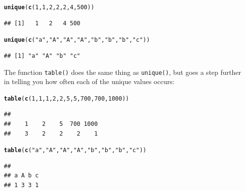 \documentclass{tufte-book}\usepackage[]{graphicx}\usepackage[]{color}
\makeatletter
\newcommand{\hlnum}[1]{\textcolor[rgb]{0.686,0.059,0.569}{#1}}%
\newcommand{\hlstr}[1]{\textcolor[rgb]{0.192,0.494,0.8}{#1}}%
\newcommand{\hlstd}[1]{\textcolor[rgb]{0.345,0.345,0.345}{#1}}%
\newcommand{\hlkwd}[1]{\textcolor[rgb]{0.737,0.353,0.396}{\textbf{#1}}}%
\newenvironment{kframe}{%
 \def\at@end@of@kframe{}%
 \ifinner\ifhmode%
  \def\at@end@of@kframe{\end{minipage}}%
  \begin{minipage}{\columnwidth}%
 \fi\fi%
 \def\FrameCommand##1{\hskip\@totalleftmargin \hskip-\fboxsep
 \colorbox{shadecolor}{##1}\hskip-\fboxsep
     \hskip-\linewidth \hskip-\@totalleftmargin \hskip\columnwidth}%
 \MakeFramed {\advance\hsize-\width
   \@totalleftmargin\z@ \linewidth\hsize
   \@setminipage}}%
 {\par\unskip\endMakeFramed%
 \at@end@of@kframe}
\newenvironment{knitrout}{}{} %
\makeatother
\begin{document}
\begin{footnotesize}
\begin{footnotesize}
\begin{knitrout}
\color{fgcolor}\begin{kframe}
\begin{alltt}
\hlkwd{unique}\hlstd{(}\hlkwd{c}\hlstd{(}\hlnum{1}\hlstd{,} \hlnum{1}\hlstd{,} \hlnum{2}\hlstd{,} \hlnum{2}\hlstd{,} \hlnum{2}\hlstd{,} \hlnum{4}\hlstd{,} \hlnum{500}\hlstd{))}
\end{alltt}
\begin{verbatim}
## [1]   1   2   4 500
\end{verbatim}
\begin{alltt}
\hlkwd{unique}\hlstd{(}\hlkwd{c}\hlstd{(}\hlstr{"a"}\hlstd{,} \hlstr{"A"}\hlstd{,} \hlstr{"A"}\hlstd{,} \hlstr{"A"}\hlstd{,} \hlstr{"b"}\hlstd{,} \hlstr{"b"}\hlstd{,} \hlstr{"b"}\hlstd{,} \hlstr{"c"}\hlstd{))}
\end{alltt}
\begin{verbatim}
## [1] "a" "A" "b" "c"
\end{verbatim}
\end{kframe}
\end{knitrout}
\end{footnotesize}

The function \texttt{table()} does the same thing as \texttt{unique()}, but goes a step further in telling you how often each of the unique values occurs:


\begin{footnotesize}
\begin{knitrout}
\color{fgcolor}\begin{kframe}
\begin{alltt}
\hlkwd{table}\hlstd{(}\hlkwd{c}\hlstd{(}\hlnum{1}\hlstd{,} \hlnum{1}\hlstd{,} \hlnum{1}\hlstd{,} \hlnum{2}\hlstd{,} \hlnum{2}\hlstd{,} \hlnum{5}\hlstd{,} \hlnum{5}\hlstd{,} \hlnum{700}\hlstd{,} \hlnum{700}\hlstd{,} \hlnum{1000}\hlstd{))}
\end{alltt}
\begin{verbatim}
## 
##    1    2    5  700 1000 
##    3    2    2    2    1
\end{verbatim}
\begin{alltt}
\hlkwd{table}\hlstd{(}\hlkwd{c}\hlstd{(}\hlstr{"a"}\hlstd{,} \hlstr{"A"}\hlstd{,} \hlstr{"A"}\hlstd{,} \hlstr{"A"}\hlstd{,} \hlstr{"b"}\hlstd{,} \hlstr{"b"}\hlstd{,} \hlstr{"b"}\hlstd{,} \hlstr{"c"}\hlstd{))}
\end{alltt}
\begin{verbatim}
## 
## a A b c 
## 1 3 3 1
\end{verbatim}
\end{kframe}
\end{knitrout}
\end{footnotesize}


\end{footnotesize}
\end{document}
